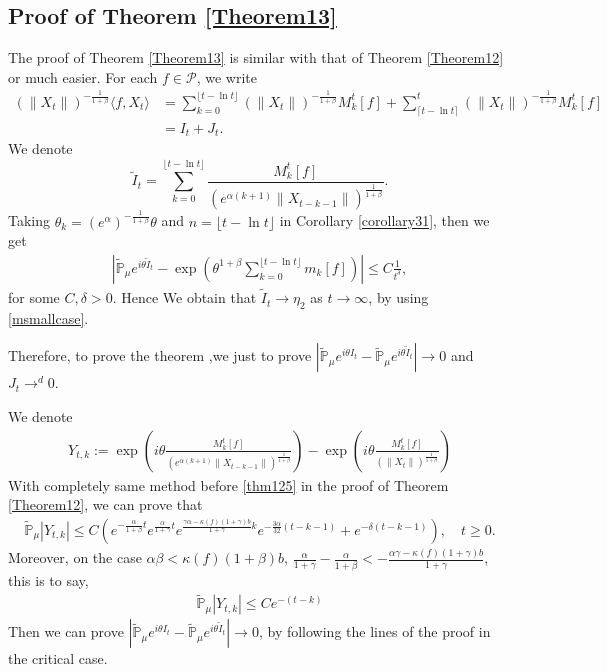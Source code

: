 \documentclass[12pt,oneside,english]{amsart}
\theoremstyle{plain}
\theoremstyle{definition}
\numberwithin{equation}{section}
\begin{document}
\subsection{Proof of Theorem \ref{Theorem13}}
The proof of Theorem \ref{Theorem13} is similar with that of Theorem \ref{Theorem12} or much easier.
     For each $f\in \mathcal{P}$, we write
    \begin{align*}
        (\|X_t\|)^{-\frac{1}{1+\beta}}\langle f,X_t\rangle&=\sum_{k=0}^{\lfloor t-\ln t \rfloor} (\|X_t\|)^{-\frac{1}{1+\beta}}M_k^t[f]+\sum_{\lceil t-\ln t \rceil}^t (\|X_t\|)^{-\frac{1}{1+\beta}}M_k^t[f]\\
        &=I_t+J_t.
    \end{align*}
    We denote
    $$\tilde{I}_t=\sum_{k=0}^{\lfloor t-\ln t \rfloor}\frac{M_k^t[f]}{( e^{\alpha(k+1)}\|X_{t-k-1}\|)^{\frac{1}{1+\beta}}}.$$
    Taking $\theta_k=( e^{\alpha})^{-\frac{1}{1+\beta}} \theta $ and $n={\lfloor t-\ln t \rfloor}$ in Corollary \ref{corollary31}, then we get
    \begin{align*}
        \left|\mathbb{\tilde{P}}_{\mu}e^{i\theta\tilde{I}_t}-\exp\left(\theta^{1+\beta}\sum_{k=0}^{\lfloor t-\ln t \rfloor}m_k[f]\right)\right|\leq C \frac{1}{t^{\delta}},
    \end{align*}
    for some $C,\delta>0$. Hence We obtain that $\tilde{I}_t\rightarrow\eta_2$ as $t\rightarrow \infty$, by using  \eqref{msmallcase}.

    Therefore, to prove the theorem ,we just to prove $\left|\mathbb{\tilde{P}}_{\mu}e^{i\theta I_t}-\mathbb{\tilde{P}}_{\mu}e^{i\theta\tilde{I}_t}\right|\rightarrow 0$ and $J_t\rightarrow^d 0$.

    We denote
    \begin{align*}
        Y_{t,k}:=\exp\left(i\theta\frac{M_k^t[f]}{( e^{\alpha(k+1)}\|X_{t-k-1}\|)^{\frac{1}{1+\beta}}}\right)-\exp\left(i\theta\frac{M_k^t[f]}{\left(\|X_t\|\right)^{\frac{1}{1+\beta}}}\right)
    \end{align*}
With completely same method before \eqref{thm125} in the proof of Theorem \ref{Theorem12}, we can prove that
\begin{align*}
    \mathbb{\tilde{P}}_{\mu}|Y_{t,k}|\leq C( e^{-\frac{\alpha}{1+\beta}t}e^{\frac{\alpha}{1+\gamma}t}e^{\frac{\gamma \alpha-\kappa(f)(1+\gamma)b}{1+\gamma}k}e^{-\frac{3\alpha}{32}(t-k-1)}+ e^{-\delta(t-k-1)}), \quad t\geq 0.
\end{align*}
Moreover, on the case $\alpha\beta<\kappa(f)(1+\beta)b$,  $\frac{\alpha}{1+\gamma}-\frac{\alpha}{1+\beta}< - \frac{\alpha\gamma-\kappa(f)(1+\gamma)b}{1+\gamma}$, this is to say,
\begin{align*}
    \mathbb{\tilde{P}}_{\mu}|Y_{t,k}|\leq C e^{-(t-k)}
\end{align*}
Then we can prove $\left|\mathbb{\tilde{P}}_{\mu}e^{i\theta I_t}-\mathbb{\tilde{P}}_{\mu}e^{i\theta\tilde{I}_t}\right|\rightarrow 0$, by following the lines of the proof in the critical case.
\end{document}
